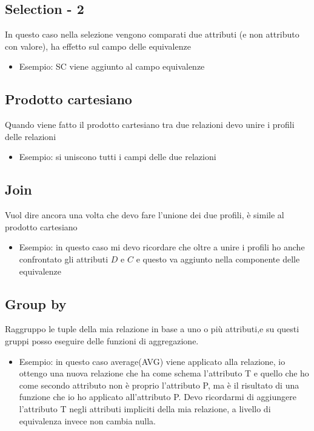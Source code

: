 \documentclass{report}
\begin{document}
\subsection{Selection - 2}
In questo caso nella selezione vengono comparati due attributi (e non attributo con valore), ha effetto sul campo delle equivalenze
\begin{itemize}
    \item Esempio: SC viene aggiunto al campo equivalenze
\end{itemize}

\subsection{Prodotto cartesiano}
Quando viene fatto il prodotto cartesiano tra due relazioni devo unire i profili delle relazioni
\begin{itemize}
    \item Esempio: si uniscono tutti i campi delle due relazioni
\end{itemize}

\subsection{Join}
Vuol dire ancora una volta che devo fare l'unione dei due profili, è simile al prodotto cartesiano 
\begin{itemize}
    \item Esempio: in questo caso mi devo ricordare che oltre a unire i profili ho anche confrontato gli attributi $D$ e $C$ e questo va aggiunto nella componente delle equivalenze 
\end{itemize}


\subsection{Group by}
Raggruppo le tuple della mia relazione in base a uno o più attributi,e su questi gruppi posso eseguire delle funzioni di aggregazione.
\begin{itemize}
    \item Esempio: in questo caso average(AVG) viene applicato alla relazione, io ottengo una nuova relazione che ha come schema l'attributo T e quello che ho come secondo attributo
    non è proprio l'attributo P, ma è il risultato di una funzione che io ho applicato all'attributo P. 
    Devo ricordarmi di aggiungere l'attributo T negli attributi impliciti della mia relazione, a livello di equivalenza invece non cambia nulla.
\end{itemize}
\end{document}
